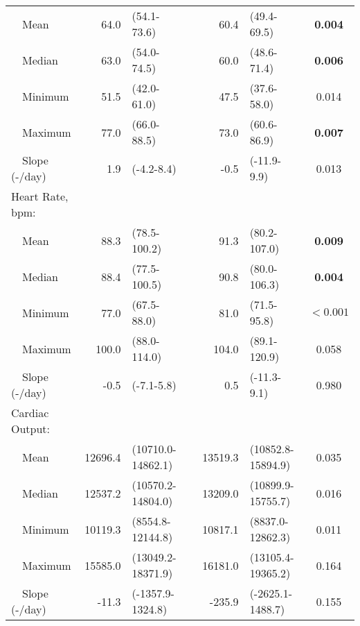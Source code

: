 {\begin{tabular}{l r l c r l c}
~~Mean & 64.0 & (54.1-73.6) & & 60.4 & (49.4-69.5) & \textbf{0.004} \\ 
~~Median & 63.0 & (54.0-74.5) & & 60.0 & (48.6-71.4) & \textbf{0.006} \\ 
~~Minimum & 51.5 & (42.0-61.0) & & 47.5 & (37.6-58.0) & 0.014 \\ 
~~Maximum & 77.0 & (66.0-88.5) & & 73.0 & (60.6-86.9) & \textbf{0.007} \\ 
~~Slope (-/day) & 1.9 & (-4.2-8.4) & & -0.5 & (-11.9-9.9) & 0.013 \\ 
Heart Rate, bpm: & & & & & & \\ 
~~Mean & 88.3 & (78.5-100.2) & & 91.3 & (80.2-107.0) & \textbf{0.009} \\ 
~~Median & 88.4 & (77.5-100.5) & & 90.8 & (80.0-106.3) & \textbf{0.004} \\ 
~~Minimum & 77.0 & (67.5-88.0) & & 81.0 & (71.5-95.8) & $\mathbf{<0.001}$ \\ 
~~Maximum & 100.0 & (88.0-114.0) & & 104.0 & (89.1-120.9) & 0.058 \\ 
~~Slope (-/day) & -0.5 & (-7.1-5.8) & & 0.5 & (-11.3-9.1) & 0.980 \\ 
Cardiac Output: & & & & & & \\ 
~~Mean & 12696.4 & (10710.0-14862.1) & & 13519.3 & (10852.8-15894.9) & 0.035 \\ 
~~Median & 12537.2 & (10570.2-14804.0) & & 13209.0 & (10899.9-15755.7) & 0.016 \\ 
~~Minimum & 10119.3 & (8554.8-12144.8) & & 10817.1 & (8837.0-12862.3) & 0.011 \\ 
~~Maximum & 15585.0 & (13049.2-18371.9) & & 16181.0 & (13105.4-19365.2) & 0.164 \\ 
~~Slope (-/day) & -11.3 & (-1357.9-1324.8) & & -235.9 & (-2625.1-1488.7) & 0.155 \\ 
\bottomrule
\end{tabular}
}
